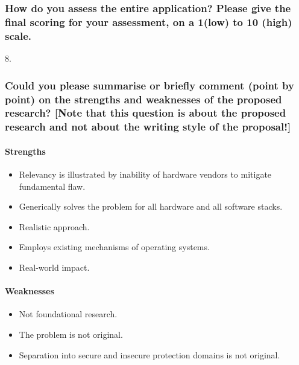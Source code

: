 \subsubsection*{How do you assess the entire application? Please give the final scoring for your assessment, on a 1(low) to 10 (high) scale.}
8.

\subsubsection*{Could you please summarise or briefly comment (point by point) on the strengths and weaknesses of the proposed research? [Note that this question is about the proposed research and not about the writing style of the proposal!]}
\paragraph{Strengths}
\begin{itemize}
  \item Relevancy is illustrated by inability of hardware vendors to mitigate fundamental flaw.
  \item Generically solves the problem for all hardware and all software stacks.
  \item Realistic approach.
  \item Employs existing mechanisms of operating systems.
  \item Real-world impact.
\end{itemize}

\paragraph{Weaknesses}
\begin{itemize}
  \item Not foundational research.
  \item The problem is not original.
  \item Separation into secure and insecure protection domains is not original.
\end{itemize}
